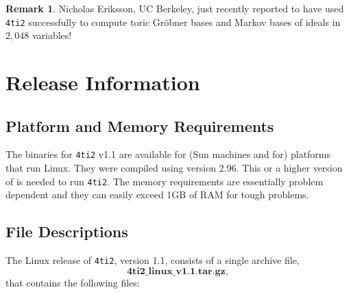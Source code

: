 \documentclass[12pt]{article}
\newcommand\Command{\begingroup \urlstyle{sf}\Url}
\theoremstyle{definition}
\newtheorem*{Remark}{Remark}
\newcommand{\important}{\textbf}
\newcommand{\FourTiTwo}{{\tt 4ti2}}
\begin{document}
\begin{Remark}
  Nicholas Eriksson, UC Berkeley, just recently reported to
  have used \FourTiTwo{} successfully to compute toric Gr\"obner bases
  and Markov bases of ideals in $2,048$ variables!
\end{Remark}
























\section{Release Information}

\subsection{Platform and Memory Requirements}

The binaries for \FourTiTwo{} v1.1 are available for (Sun machines and
for) platforms that run Linux. They were compiled using \Command{gcc}
version 2.96. This or a higher version of \Command{gcc} is needed to
run \FourTiTwo{}. The memory requirements are essentially problem
dependent and they can easily exceed 1GB of RAM for tough problems.





\subsection{File Descriptions} 
The Linux release of \FourTiTwo{}, version 1.1, consists of a single
archive file, 
\[
\important{4ti2\_linux\_v1.1.tar.gz},
\]
that contains the following files:
 
\end{document}
